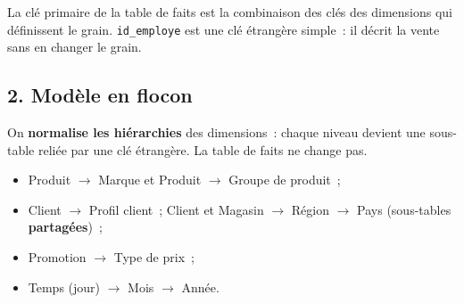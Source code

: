 \vspace{0.5cm}
\noindent La clé primaire de la table de faits est la combinaison des clés des dimensions qui définissent le grain. \texttt{id\_employe} est une clé étrangère simple~: il décrit la vente sans en changer le grain.

\newpage
\subsection*{2. Modèle en flocon}
{}

\noindent On \textbf{normalise les hiérarchies} des dimensions~: chaque niveau devient une sous-table reliée par une clé étrangère. La table de faits ne change pas.
\begin{itemize}
	\item Produit $\rightarrow$ Marque et Produit $\rightarrow$ Groupe de produit~;
	\item Client $\rightarrow$ Profil client~; Client et Magasin $\rightarrow$ Région $\rightarrow$ Pays (sous-tables \textbf{partagées})~;
	\item Promotion $\rightarrow$ Type de prix~;
	\item Temps (jour) $\rightarrow$ Mois $\rightarrow$ Année.
\end{itemize}

